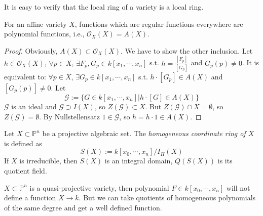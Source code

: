 It is easy to verify that the local ring of a variety is a local ring.
\begin{proposition}\label{10}
	For an affine variety $ X $, functions which are regular functions everywhere are polynomial functions, i.e., $ \mathcal{O}_X(X)=A(X) $.
\end{proposition}
\begin{proof}
	Obviously, $ A(X)\subset \mathcal{O}_X(X) $. We have to show the other inclusion. Let $ h\in \mathcal{O}_X(X) $, $ \forall p\in X $, $ \exists F_p,G_p\in k[x_1,\cdots,x_n] $ s.t.
	$ h=\frac{[F_p]}{[G_p]} $ and $ G_p(p)\neq 0 $. It is equivalent to: $ \forall p\in X $, $ \exists G_p\in k[x_1,\cdots,x_n] $ s.t. $ h\cdot [G_p] \in A(X)$ and $ [G_p(p)]\neq 0 $. Let
	\begin{equation}
		\mathcal{G}:=\{ G\in k[x_1,\cdots,x_n]|h\cdot [G]\in A(X) \}
	\end{equation}
	$ \mathcal{G} $ is an ideal and $ \mathcal{G}\supset I(X) $, so $ Z(\mathcal{G})\subset X $. But $ Z(\mathcal{G})\cap X=\emptyset $, so $ Z(\mathcal{G})=\emptyset $. By Nullstellensatz $ 1\in\mathcal{G} $, so $ h=h\cdot 1\in A(X) $.
\end{proof}

\begin{definition}
	Let $ X\subset\mathbb{P}^n $ be a projective algebraic set. The \textit{homogeneous coordinate ring of $ X $} is defined as
	\begin{equation}
		S(X):=k[x_0,\cdots,x_n]/I_H(X)
	\end{equation}
	If $ X $ is irreducible, then $ S(X) $ is an integral domain, $ Q(S(X)) $ is its quotient field.
\end{definition}
\begin{remark}
	$ X\subset \mathbb{P}^n$ is a quasi-projective variety, then polynomial $ F\in k[x_0,\cdots,x_n] $ will not define a function $ X\to k $. But we can take quotients of homogeneous polynomials of the same degree and get a well defined function.
\end{remark}

